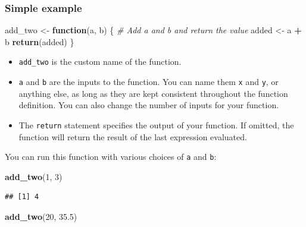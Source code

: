 \documentclass[
]{book}
\newenvironment{Shaded}{\begin{snugshade}}{\end{snugshade}}
\newcommand{\CommentTok}[1]{\textcolor[rgb]{0.56,0.35,0.01}{\textit{#1}}}
\newcommand{\ControlFlowTok}[1]{\textcolor[rgb]{0.13,0.29,0.53}{\textbf{#1}}}
\newcommand{\DecValTok}[1]{\textcolor[rgb]{0.00,0.00,0.81}{#1}}
\newcommand{\FloatTok}[1]{\textcolor[rgb]{0.00,0.00,0.81}{#1}}
\newcommand{\FunctionTok}[1]{\textcolor[rgb]{0.13,0.29,0.53}{\textbf{#1}}}
\newcommand{\NormalTok}[1]{#1}
\newcommand{\OtherTok}[1]{\textcolor[rgb]{0.56,0.35,0.01}{#1}}
\newcommand{\SpecialCharTok}[1]{\textcolor[rgb]{0.81,0.36,0.00}{\textbf{#1}}}
\providecommand{\tightlist}{%
  \setlength{\itemsep}{0pt}\setlength{\parskip}{0pt}}
\begin{document}
\hypertarget{simple-example}{%
\subsubsection{Simple example}\label{simple-example}}

\begin{Shaded}
\begin{Highlighting}[]
\NormalTok{add\_two }\OtherTok{\textless{}{-}} \ControlFlowTok{function}\NormalTok{(a, b) \{}
  \CommentTok{\# Add a and b and return the value}
\NormalTok{  added }\OtherTok{\textless{}{-}}\NormalTok{ a }\SpecialCharTok{+}\NormalTok{ b}
  \FunctionTok{return}\NormalTok{(added)}
\NormalTok{\}}
\end{Highlighting}
\end{Shaded}

\begin{itemize}
\tightlist
\item
  \texttt{add\_two} is the custom name of the function.
\item
  \texttt{a} and \texttt{b} are the inputs to the function. You can name them \texttt{x} and \texttt{y}, or anything else, as long as they are kept consistent throughout the function definition. You can also change the number of inputs for your function.
\item
  The \texttt{return} statement specifies the output of your function. If omitted, the function will return the result of the last expression evaluated.
\end{itemize}

You can run this function with various choices of \texttt{a} and \texttt{b}:

\begin{Shaded}
\begin{Highlighting}[]
\FunctionTok{add\_two}\NormalTok{(}\DecValTok{1}\NormalTok{, }\DecValTok{3}\NormalTok{)}
\end{Highlighting}
\end{Shaded}

\begin{verbatim}
## [1] 4
\end{verbatim}

\begin{Shaded}
\begin{Highlighting}[]
\FunctionTok{add\_two}\NormalTok{(}\DecValTok{20}\NormalTok{, }\FloatTok{35.5}\NormalTok{)}
\end{Highlighting}
\end{Shaded}
\end{document}

